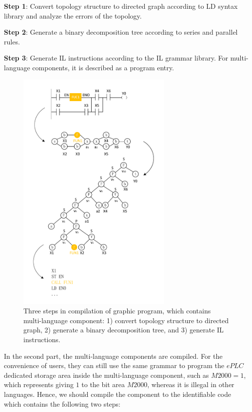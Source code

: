 \documentclass[journal,UTF8]{IEEEtran}
\begin{document}
	\textbf{Step 1}: Convert topology structure to directed graph according to LD syntax library and analyze the errors of the topology.
	
	\textbf{Step 2}: Generate a binary decomposition tree according to series and parallel rules.
	
	\textbf{Step 3}: Generate IL instructions according to the IL grammar library. For multi-language components, it is described as a program entry.
	
	\begin{figure}
		\centering
		\includegraphics[width=3in]{fig/Compile.pdf}
		\caption{Three steps in compilation of graphic program, which contains multi-language component: 1) convert topology structure to directed graph, 2) generate a binary decomposition tree, and 3) generate IL instructions.}
		\label{fig:Compile}
	\end{figure}
	
	In the second part, the multi-language components are compiled. For the convenience of users, they can still use the same grammar to program the $ePLC$ dedicated storage area inside the multi-language component, such as $M2000=1$, which represents giving $1$ to the bit area $M2000$, whereas it is illegal in other languages. Hence, we should compile the component to the identifiable code which contains the following two steps:
	
\end{document}
